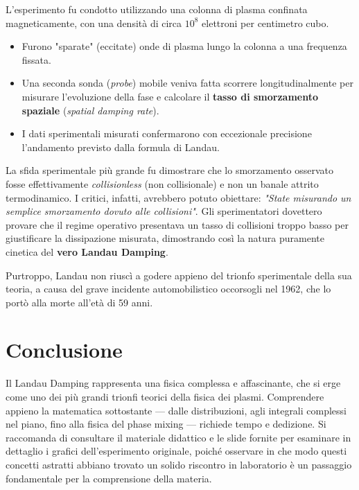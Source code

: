 L'esperimento fu condotto utilizzando una colonna di plasma confinata magneticamente, con una densità di circa $10^8$ elettroni per centimetro cubo.
\begin{itemize}
\item Furono "sparate" (eccitate) onde di plasma lungo la colonna a una frequenza fissata.
\item Una seconda sonda (\textit{probe}) mobile veniva fatta scorrere longitudinalmente per misurare l'evoluzione della fase e calcolare il \textbf{tasso di smorzamento spaziale} (\textit{spatial damping rate}).
\item I dati sperimentali misurati confermarono con eccezionale precisione l'andamento previsto dalla formula di Landau.
\end{itemize}

La sfida sperimentale più grande fu dimostrare che lo smorzamento osservato fosse effettivamente \textit{collisionless} (non collisionale) e non un banale attrito termodinamico. I critici, infatti, avrebbero potuto obiettare: \textit{"State misurando un semplice smorzamento dovuto alle collisioni"}. Gli sperimentatori dovettero provare che il regime operativo presentava un tasso di collisioni troppo basso per giustificare la dissipazione misurata, dimostrando così la natura puramente cinetica del \textbf{vero Landau Damping}.

Purtroppo, Landau non riuscì a godere appieno del trionfo sperimentale della sua teoria, a causa del grave incidente automobilistico occorsogli nel 1962, che lo portò alla morte all'età di 59 anni.

\section{Conclusione}
Il Landau Damping rappresenta una fisica complessa e affascinante, che si erge come uno dei più grandi trionfi teorici della fisica dei plasmi. Comprendere appieno la matematica sottostante — dalle distribuzioni, agli integrali complessi nel piano, fino alla fisica del phase mixing — richiede tempo e dedizione.
Si raccomanda di consultare il materiale didattico e le slide fornite per esaminare in dettaglio i grafici dell'esperimento originale, poiché osservare in che modo questi concetti astratti abbiano trovato un solido riscontro in laboratorio è un passaggio fondamentale per la comprensione della materia.